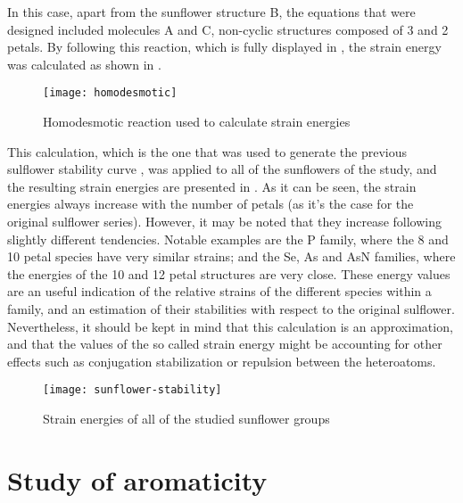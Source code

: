 In this case, apart from the sunflower structure B, the equations that were designed included molecules A and C, non-cyclic structures composed of 3 and 2 petals.  By following this reaction, which is fully displayed in , the strain energy was calculated as shown in .

\begin{figure}
    \centering
    \texttt{[image: homodesmotic]}
    \caption[Homodesmotic reaction used to calculate strain energies]{Homodesmotic reaction used to calculate strain energies}
\end{figure}

This calculation, which is the one that was used to generate the previous sulflower stability curve , was applied to all of the sunflowers of the study, and the resulting strain energies are presented in .
As it can be seen, the strain energies always increase with the number of petals (as it's the case for the original sulflower series).
However, it may be noted that they increase following slightly different tendencies.
Notable examples are the P family, where the 8 and 10 petal species have very similar strains; and the Se, As and AsN families, where the energies of the 10 and 12 petal structures are very close.
These energy values are an useful indication of the relative strains of the different species within a family, and an estimation of their
stabilities with respect to the original sulflower.
Nevertheless, it should be kept in mind that this calculation is an approximation, and that the values of the so called strain energy might be accounting for other effects such as conjugation stabilization or repulsion between the heteroatoms.

\begin{figure}
    \centering
    \texttt{[image: sunflower-stability]}
    \caption[Strain energies of sunflower groups]{Strain energies of all of the studied sunflower groups}
\end{figure}


\section{Study of aromaticity}

